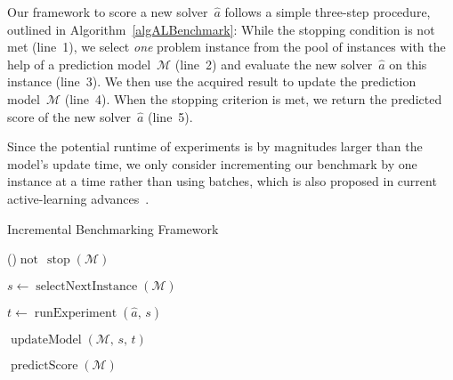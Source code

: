 \documentclass[runningheads]{llncs}
\begin{document}
Our framework to score a new solver~$\hat{a}$ follows a simple three-step procedure, outlined in Algorithm~\ref{algALBenchmark}:
While the stopping condition is not met (line~1), we select \emph{one} problem instance from the pool of instances with the help of a prediction model~$\mathcal{M}$ (line~2) and evaluate the new solver~$\hat{a}$ on this instance (line~3).
We then use the acquired result to update the prediction model~$\mathcal{M}$ (line~4).
When the stopping criterion is met, we return the predicted score of the new solver~$\hat{a}$ (line~5).

Since the potential runtime of experiments is by magnitudes larger than the model's update time, we only consider incrementing our benchmark by one instance at a time rather than using batches, which is also proposed in current active-learning advances~\cite{SinhaED19,2019gaal}.

\begin{algorithm}
  \caption{Incremental Benchmarking Framework}
  \label{algALBenchmark}


  \BlankLine


  \While(){$\operatorname{not} \, \operatorname{stop}\!\left(\mathcal{M}\right)$}{
    $s \leftarrow \operatorname{selectNextInstance}\!\left(\mathcal{M}\right)$ 

    $t \leftarrow \operatorname{runExperiment}\!\left(\hat{a},\,  s\right)$  


    $\operatorname{updateModel}\!\left(\mathcal{M},\, s,\, t\right)$ 
  }
  
  \Return $\operatorname{predictScore}\!\left(\mathcal{M}\right)$ 

\end{algorithm}
\end{document}
